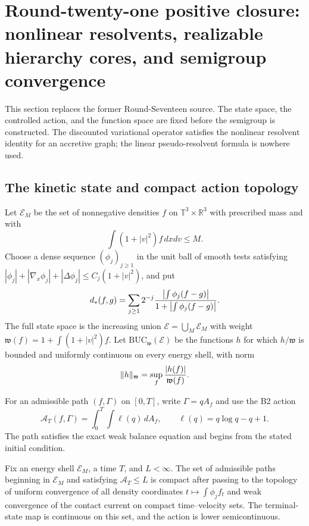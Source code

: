 \section{Round-twenty-one positive closure: nonlinear resolvents, realizable hierarchy cores, and semigroup convergence}
\label{sec:r21-b4}

This section replaces the former Round-Seventeen source.  The state space, the
controlled action, and the function space are fixed before the semigroup is
constructed.  The discounted variational operator satisfies the nonlinear
resolvent identity for an accretive graph; the linear pseudo-resolvent formula
is nowhere used.

\subsection{The kinetic state and compact action topology}

Let $\mathcal E_M$ be the set of nonnegative densities $f$ on
$\mathbb T^3\times\mathbb R^3$ with prescribed mass and with
\[
 \int (1+|v|^2)f\,dxdv\le M.
\]
Choose a dense sequence $(\phi_j)_{j\ge1}$ in the unit ball of smooth tests
satisfying
$|\phi_j|+|\nabla_x\phi_j|+|\Delta\phi_j|\le C_j(1+|v|^2)$, and put
\[
 d_*(f,g)=\sum_{j\ge1}2^{-j}
 {\left|\int\phi_j(f-g)\right|\over
  1+\left|\int\phi_j(f-g)\right|}.
\]
The full state space is the increasing union
$\mathcal E=\bigcup_M\mathcal E_M$ with weight
$\mathfrak w(f)=1+\int(1+|v|^2)f$.  Let
$\mathrm{BUC}_{\mathfrak w}(\mathcal E)$ be the functions $h$ for which
$h/\mathfrak w$ is bounded and uniformly continuous on every energy shell,
with norm
\[
 \|h\|_{\mathfrak w}=\sup_f{|h(f)|\over\mathfrak w(f)}.
\]

For an admissible path $(f,\Gamma)$ on $[0,T]$, write
$\Gamma=qA_f$ and use the B2 action
\[
 \mathcal A_T(f,\Gamma)=\int_0^T\int\ell(q)\,dA_f,
 \qquad \ell(q)=q\log q-q+1.
\]
The path satisfies the exact weak balance equation and begins from the stated
initial condition.

\begin{theorem}
\label{thm:r21-b4-compact}
Fix an energy shell $\mathcal E_M$, a time $T$, and $L<\infty$.  The set of
admissible paths beginning in $\mathcal E_M$ and satisfying
$\mathcal A_T\le L$ is compact after passing to the topology of uniform
convergence of all density coordinates
$t\mapsto\int\phi_j f_t$ and weak convergence of the contact current on
compact time--velocity sets.  The terminal-state map is continuous on this
set, and the action is lower semicontinuous.
\end{theorem}


